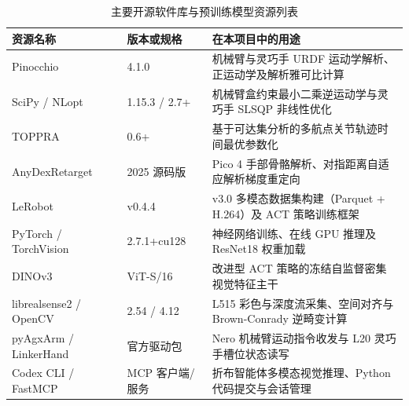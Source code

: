 \begin{table}[htbp]
\centering
\caption{主要开源软件库与预训练模型资源列表}
\label{tab:software-resources}
\footnotesize
\setlength{\tabcolsep}{4pt}
\begin{tabular}{@{}llp{7.6cm}@{}}
  \toprule
  资源名称 & 版本或规格 & 在本项目中的用途 \\
  \midrule
  Pinocchio~\cite{carpentier2019pinocchio} & 4.1.0 & 机械臂与灵巧手 URDF 运动学解析、正运动学及解析雅可比计算 \\
  SciPy / NLopt~\cite{kraft1988software} & 1.15.3 / 2.7+ & 机械臂盒约束最小二乘逆运动学与灵巧手 SLSQP 非线性优化 \\
  TOPPRA~\cite{pham2018toppra} & 0.6+ & 基于可达集分析的多航点关节轨迹时间最优参数化 \\
  AnyDexRetarget~\cite{qiu2025anydexretarget} & 2025 源码版 & Pico 4 手部骨骼解析、对指距离自适应解析梯度重定向 \\
  LeRobot~\cite{cadene2026lerobot} & v0.4.4 & v3.0 多模态数据集构建（Parquet + H.264）及 ACT 策略训练框架 \\
  PyTorch / TorchVision & 2.7.1+cu128 & 神经网络训练、在线 GPU 推理及 ResNet18 权重加载 \\
  DINOv3~\cite{simeoni2025dinov3} & ViT-S/16 & 改进型 ACT 策略的冻结自监督密集视觉特征主干 \\
  librealsense2 / OpenCV & 2.54 / 4.12 & L515 彩色与深度流采集、空间对齐与 Brown-Conrady 逆畸变计算 \\
  pyAgxArm / LinkerHand & 官方驱动包 & Nero 机械臂运动指令收发与 L20 灵巧手槽位状态读写 \\
  Codex CLI / FastMCP & MCP 客户端/服务 & 折布智能体多模态视觉推理、Python 代码提交与会话管理 \\
  \bottomrule
\end{tabular}
\end{table}
